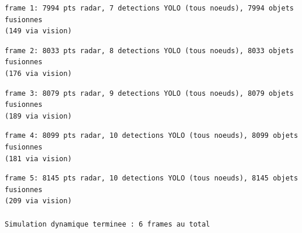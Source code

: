 \documentclass[11pt]{article}
\begin{document}
    \begin{Verbatim}[commandchars=\\\{\}]
frame 1: 7994 pts radar, 7 detections YOLO (tous noeuds), 7994 objets fusionnes
(149 via vision)
    \end{Verbatim}

    \begin{Verbatim}[commandchars=\\\{\}]
frame 2: 8033 pts radar, 8 detections YOLO (tous noeuds), 8033 objets fusionnes
(176 via vision)
    \end{Verbatim}

    \begin{Verbatim}[commandchars=\\\{\}]
frame 3: 8079 pts radar, 9 detections YOLO (tous noeuds), 8079 objets fusionnes
(189 via vision)
    \end{Verbatim}

    \begin{Verbatim}[commandchars=\\\{\}]
frame 4: 8099 pts radar, 10 detections YOLO (tous noeuds), 8099 objets fusionnes
(181 via vision)
    \end{Verbatim}

    \begin{Verbatim}[commandchars=\\\{\}]
frame 5: 8145 pts radar, 10 detections YOLO (tous noeuds), 8145 objets fusionnes
(209 via vision)

Simulation dynamique terminee : 6 frames au total
    \end{Verbatim}
\end{document}

